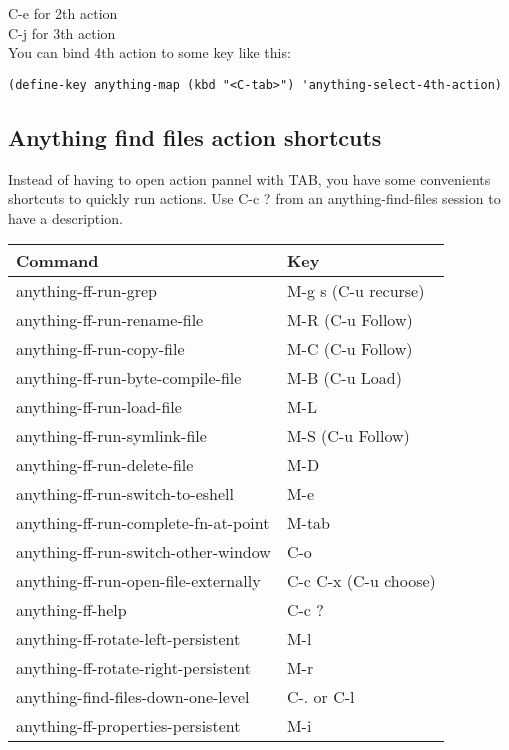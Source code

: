 \documentclass[a4paper,11pt]{article}
\begin{document}
C-e for 2th action\\
C-j for 3th action\\

You can bind 4th action to some key like this:
\begin{verbatim}
(define-key anything-map (kbd "<C-tab>") 'anything-select-4th-action)
\end{verbatim}
\newpage
\subsection{Anything find files action shortcuts}
\label{sec:anything-find-files-1}
Instead of having to open action pannel with TAB, 
you have some convenients shortcuts to quickly run actions.
Use C-c ? from an anything-find-files session to have a description.\\

\begin{tabular}{| l | l |}
  \hline
  Command & Key \\
  \hline
  anything-ff-run-grep & M-g s (C-u recurse)\\
  \hline
  anything-ff-run-rename-file & M-R (C-u Follow)\\
  \hline
  anything-ff-run-copy-file & M-C (C-u Follow)\\
  \hline
  anything-ff-run-byte-compile-file & M-B (C-u Load)\\
  \hline
  anything-ff-run-load-file & M-L \\
  \hline
  anything-ff-run-symlink-file & M-S (C-u Follow)\\
  \hline
  anything-ff-run-delete-file & M-D \\
  \hline
  anything-ff-run-switch-to-eshell & M-e \\
  \hline
  anything-ff-run-complete-fn-at-point & M-tab \\
  \hline
  anything-ff-run-switch-other-window & C-o \\
  \hline
  anything-ff-run-open-file-externally & C-c C-x (C-u choose)\\
  \hline
  anything-ff-help & C-c ? \\
  \hline
  anything-ff-rotate-left-persistent & M-l \\
  \hline
  anything-ff-rotate-right-persistent & M-r \\
  \hline
  anything-find-files-down-one-level & C-. or C-l \\
  \hline
  anything-ff-properties-persistent & M-i \\
  \hline
\end{tabular}
\end{document}
